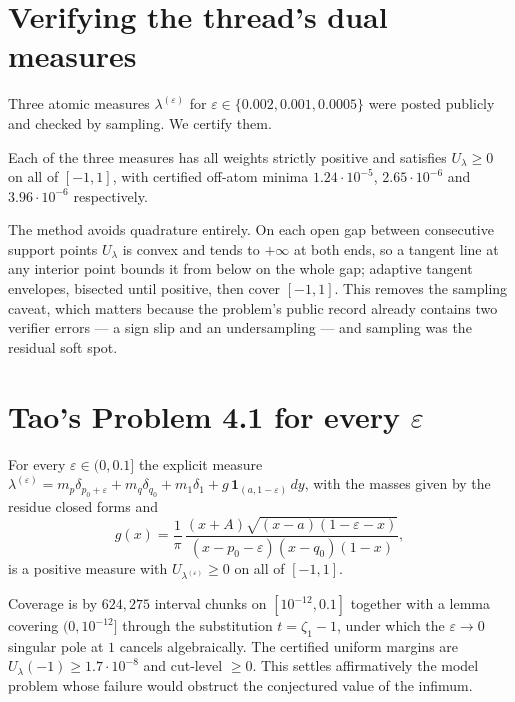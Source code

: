 \documentclass[11pt]{article}
\begin{document}
\section{Verifying the thread's dual measures}

Three atomic measures $\lambda^{(\varepsilon)}$ for
$\varepsilon\in\{0.002,0.001,0.0005\}$ were posted publicly and checked
by sampling. We certify them.

\begin{theorem}
Each of the three measures has all weights strictly positive and
satisfies $U_{\lambda}\ge 0$ on all of $[-1,1]$, with certified
off-atom minima $1.24\cdot10^{-5}$, $2.65\cdot10^{-6}$ and
$3.96\cdot10^{-6}$ respectively.
\end{theorem}

The method avoids quadrature entirely. On each open gap between
consecutive support points $U_\lambda$ is convex and tends to $+\infty$
at both ends, so a tangent line at any interior point bounds it from
below on the whole gap; adaptive tangent envelopes, bisected until
positive, then cover $[-1,1]$. This removes the sampling caveat, which
matters because the problem's public record already contains two
verifier errors --- a sign slip and an undersampling --- and sampling
was the residual soft spot.

\section{Tao's Problem 4.1 for every $\varepsilon$}

\begin{theorem}\label{thm:family}
For every $\varepsilon\in(0,0.1]$ the explicit measure
$\lambda^{(\varepsilon)} = m_p\delta_{p_0+\varepsilon} + m_q\delta_{q_0}
+ m_1\delta_1 + g\,\mathbf{1}_{(a,1-\varepsilon)}\,dy$, with the masses
given by the residue closed forms and
\[
  g(x)=\frac{1}{\pi}\,\frac{(x+A)\sqrt{(x-a)(1-\varepsilon-x)}}
  {(x-p_0-\varepsilon)(x-q_0)(1-x)},
\]
is a positive measure with $U_{\lambda^{(\varepsilon)}}\ge 0$ on all of
$[-1,1]$.
\end{theorem}

Coverage is by $624{,}275$ interval chunks on $[10^{-12},0.1]$ together
with a lemma covering $(0,10^{-12}]$ through the substitution
$t=\zeta_1-1$, under which the $\varepsilon\to0$ singular pole at $1$
cancels algebraically. The certified uniform margins are
$U_\lambda(-1)\ge 1.7\cdot10^{-8}$ and cut-level $\ge0$. This settles
affirmatively the model problem whose failure would obstruct the
conjectured value of the infimum.
\end{document}
